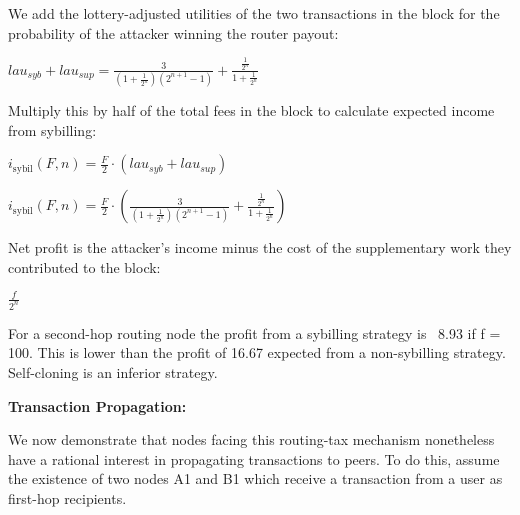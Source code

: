 \documentclass[oneside]{article}   	%
\begin{document}
\begin{multicols}{2}
We add the lottery-adjusted utilities of the two transactions in the block for the probability of the attacker winning the router payout:

\large
\begin{adjustwidth}{1.5em}{1.5em} 
	\begin{math}
lau_{syb} + lau_{sup} = \frac{3}{\left(1+\frac{1}{2^n}\right)\left(2^{n+1}-1\right)}+\frac{\frac{1}{2^n}}{1+\frac{1}{2^n}}
	\end{math}
\end{adjustwidth}
\normalsize

Multiply this by half of the total fees in the block to calculate expected income from sybilling:

\large
\begin{adjustwidth}{1.5em}{1.5em} 
	\begin{math}
i_{\text{sybil}}(F, n) = \frac{F}{2} \cdot \left(lau_{syb} + lau_{sup}\right)
	\end{math}
\end{adjustwidth}
\normalsize

\large
\begin{adjustwidth}{1.5em}{1.5em} 
	\begin{math}
i_{\text{sybil}}(F, n) = \frac{F}{2} \cdot \left(\frac{3}{\left(1+\frac{1}{2^n}\right)\left(2^{n+1}-1\right)}+\frac{\frac{1}{2^n}}{1+\frac{1}{2^n}}\right)
	\end{math}
\end{adjustwidth}
\normalsize

Net profit is the attacker's income minus the cost of the supplementary work they contributed to the block:

\large
\begin{adjustwidth}{1.5em}{1.5em}
	\begin{math}
\frac{f}{2^n}
	\end{math}
\end{adjustwidth}
\normalsize

For a second-hop routing node the profit from a sybilling strategy is ~8.93 if f = 100. This is lower than the profit of 16.67 expected from a non-sybilling strategy. Self-cloning is an inferior strategy.

\textbf{Transaction Propagation:}

We now demonstrate that nodes facing this routing-tax mechanism nonetheless have a rational interest in propagating transactions to peers. To do this, assume the existence of two nodes A1 and B1 which receive a transaction from a user as first-hop recipients.


\end{multicols}
\end{document}
